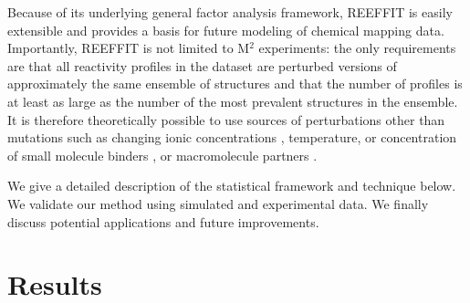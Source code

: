 \documentclass[12pt]{article}
\begin{document}
Because of its underlying general factor analysis framework, REEFFIT is easily extensible and provides a basis for future modeling of chemical mapping data. Importantly, REEFFIT is not limited to M$^2$ experiments: the only requirements are that all reactivity profiles in the dataset are perturbed versions of approximately the same ensemble of structures and that the number of profiles is at least as large as the number of the most prevalent structures in the ensemble. It is therefore theoretically possible to use sources of perturbations other than mutations such as changing ionic concentrations  \cite{Das2010}, temperature, or concentration of small molecule binders \cite{Kladwang2011f}, or macromolecule partners \cite{Kladwang2010}.

We give a detailed description of the statistical framework and technique below. We validate our method using simulated and experimental data. We finally discuss potential applications and future improvements. 


\section{Results}
\end{document}
